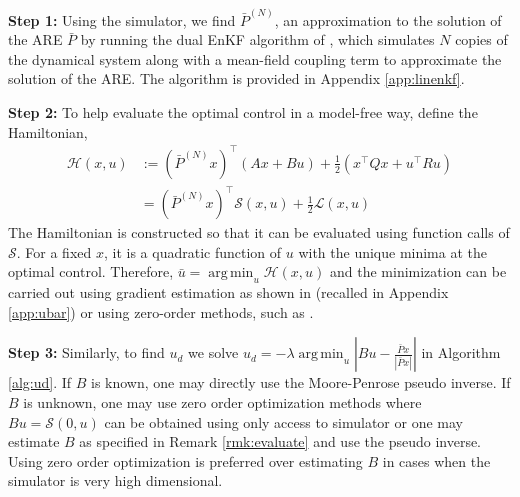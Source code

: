 \documentclass[10pt,a4paper]{amsart}
\newcommand{\tp}{^\top}
\renewcommand{\S}{\mathcal{S}}
\newcommand{\ham}{\mathcal{H}}
\newcommand{\half}{\frac{1}{2}}
\DeclareMathOperator*{\argmin}{arg\,min}
\newcommand{\todo}[1]{{\color{blue} #1}}
\renewcommand{\L}{\mathcal{L}}
\begin{document}
\textbf{Step 1:}
Using the simulator, we find $\bar{P}^{(N)}$, an approximation to the solution of the ARE $\bar{P}$ by running the dual EnKF algorithm of \cite{joshi-2022}, which simulates $N$ copies of the dynamical system  along with a mean-field coupling term to approximate the solution of the ARE. The algorithm is provided in Appendix \ref{app:linenkf}. 

\textbf{Step 2:} %
To help evaluate the optimal control in a model-free way, define the Hamiltonian,
\begin{align}
\ham(x,u) &:= (\bar{P}^{(N)}x)\tp(Ax + Bu) + \half(x\tp Q x + u\tp R u) \nonumber
\\ &= (\bar{P}^{(N)}x)\tp \S(x,u) + \half\L(x,u) \label{eq:ham-lin}
\end{align}
The Hamiltonian is constructed so that it can be evaluated using function calls of $\S$. For a fixed $x$, it is a quadratic function of $u$ with the unique minima at the optimal control. 
Therefore, $\bar{u} = \argmin_{u} \ham(x,u)$ and the minimization can be carried out using gradient estimation as shown in \cite[Algorithm 2]{joshi-2022} (recalled in Appendix \ref{app:ubar}) or using zero-order methods, such as \cite{bach-2016}. 

\textbf{Step 3:}
Similarly, to find $u_d$ we solve $u_d = -\lambda \argmin_{u} | Bu - \frac{\bar{P}x}{| \bar{P}x|} |$ in Algorithm \ref{alg:ud}.  If $B$ is known, one may directly use the Moore-Penrose pseudo inverse. If $B$ is unknown, one may use zero order optimization methods \cite{bach-2016} where $Bu = \S(0,u)$ can be obtained using only access to simulator or one may estimate $B$ as specified in Remark \ref{rmk:evaluate} and use the pseudo inverse. 
{Using zero order optimization is  preferred over estimating $B$ in cases when the simulator is very high dimensional. }
\end{document}
